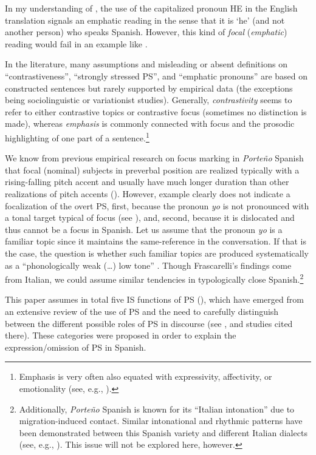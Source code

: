 \documentclass[output=paper]{langsci/langscibook}
\begin{document}
In my understanding of , the use of the capitalized pronoun HE in the English translation signals an emphatic reading in the sense that it is ‘he’ (and not another person) who speaks Spanish. However, this kind of \textit{focal} (\textit{emphatic}) reading would fail in an example like . 

In the literature, many assumptions and misleading or absent definitions on ``contrastiveness'', ``strongly stressed PS'', and ``emphatic pronouns'' are based on constructed sentences but rarely supported by empirical data (the exceptions being sociolinguistic or variationist studies). Generally, \textit{contrastivity} seems to refer to either contrastive topics or contrastive focus (sometimes no distinction is made), whereas \textit{emphasis} is commonly connected with focus and the prosodic highlighting of one part of a sentence.\footnote{Emphasis is very often also equated with expressivity, affectivity, or emotionality (see, e.g., \citealt{Pustka2015}).}

We know from previous empirical research on focus marking in \textit{Porte{\~n}o} Spanish that focal (nominal) subjects in preverbal position are realized typically with a rising-falling pitch accent and usually have much longer duration than other realizations of pitch accents (\citealt[383]{Peskova2012}). However, example  clearly does not indicate a focalization of the overt PS, first, because the pronoun \textit{yo} is not pronounced with a tonal target typical of focus (see ), and, second, because it is dislocated and thus cannot be a focus in Spanish. Let us assume that the pronoun \textit{yo} is a familiar topic since it maintains the same-reference in the conversation. If that is the case, the question is whether such familiar topics are produced systematically as a ``phonologically weak (…) low tone'' \citep[712]{Frascarelli2007}. Though Frascarelli’s findings come from Italian, we could assume similar tendencies in typologically close Spanish.\footnote{Additionally, \textit{Porte{\~n}o} Spanish is known for its ``Italian intonation'' due to migration-induced contact. Similar intonational and rhythmic patterns have been demonstrated between this Spanish variety and different Italian dialects (see, e.g., \citealt{VidaldeBattini1964,Colantoni2004,Benet2012}). This issue will not be explored here, however.}

This paper assumes in total five IS functions of PS (), which have emerged from an extensive review of the use of PS and the need to carefully distinguish between the different possible roles of PS in discourse (see \citealt{Peskova2014,Peskova.2015}, and studies cited there). These categories were proposed in order to explain the expression/omission of PS in Spanish.
\end{document}
